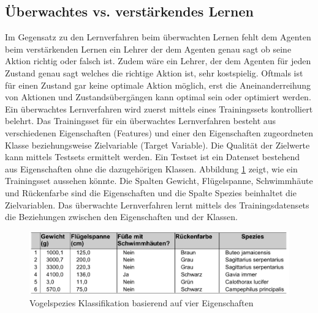 \subsection{Überwachtes \acs{vs.} verstärkendes Lernen}
Im Gegensatz zu den Lernverfahren beim überwachten Lernen fehlt dem Agenten beim verstärkenden Lernen ein Lehrer der dem Agenten genau sagt ob seine Aktion richtig oder falsch ist. Zudem wäre ein Lehrer, der dem Agenten für jeden Zustand genau sagt welches die richtige Aktion ist, sehr kostspielig. Oftmals ist für einen Zustand gar keine optimale Aktion möglich, erst die Aneinanderreihung von Aktionen und Zustandsübergängen kann optimal sein oder optimiert werden\cite[\acs{vgl.} 397]{Alpaydin}. \\

Ein überwachtes Lernverfahren wird zuerst mittels eines Trainingssets kontrolliert belehrt. Das Trainingsset für ein überwachtes Lernverfahren besteht aus verschiedenen Eigenschaften (Features) und einer den Eigenschaften zugeordneten Klasse beziehungsweise Zielvariable (Target Variable). Die Qualität der Zielwerte kann mittels Testsets ermittelt werden. Ein Testset ist ein Datenset bestehend aus Eigenschaften ohne die dazugehörigen Klassen. Abbildung \ref{fig:vogel_spezies} zeigt, wie ein Trainingsset aussehen könnte\cite[8]{Harrington}. Die Spalten Gewicht, Flügelspanne, Schwimmhäute und Rückenfarbe sind die Eigenschaften und die Spalte Spezies beinhaltet die Zielvariablen. Das überwachte Lernverfahren lernt mittels des Trainingsdatensets die Beziehungen zwischen den Eigenschaften und der Klassen. \\

\begin{figure}[!htbp]
  \centering
  \includegraphics[scale = 0.89]{inhalt/abbildungen/vogel_spezies.pdf}
  \caption{Vogelspezies Klassifikation basierend auf vier Eigenschaften}
  \label{fig:vogel_spezies}
\end{figure} 

